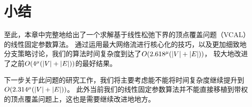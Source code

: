 \section{小结}
至此，本章中完整地给出了一个求解基于线性松弛下界的顶点覆盖问题（VCAL）的线性固定参数算法。
通过运用最大网络流进行核心化的技巧，以及更加细致地分支策略讨论，我们的算法时间复杂度到达了$O(2.618^\mu(\left\vert V \right\vert + \left\vert E \right\vert))$，
较大地改进了之前$O(4^\mu(\left\vert V \right\vert + \left\vert E \right\vert))$的最好结果。

下一步关于此问题的研究工作，我们将主要考虑能不能将时间复杂度继续提升到$O(2.314^\mu(\left\vert V \right\vert + \left\vert E \right\vert))$。
此外当前我们的线性固定参数算法并不能直接移植到带权的顶点覆盖问题上，这也是需要继续改进地地方。
